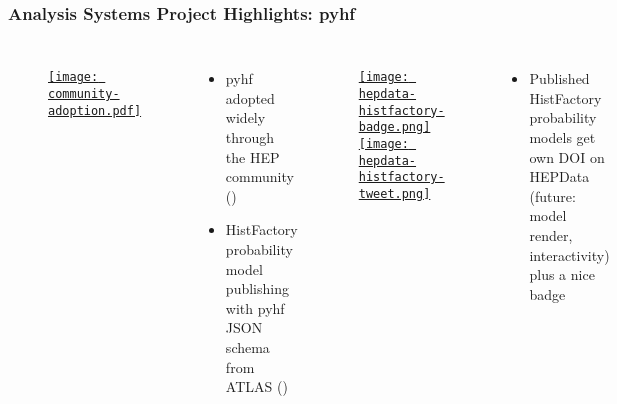 \begin{frame}
  \frametitle{Analysis Systems Project Highlights: pyhf}


  \begin{columns}
    \begin{figure}
        \begin{center}
            \href{https://scikit-hep.org/pyhf/citations.html}{\texttt{[image: community-adoption.pdf]}}
        \end{center}
    \end{figure}
    \begin{itemize}
      \item pyhf adopted widely through the HEP community ()
      \item HistFactory probability model publishing with pyhf JSON schema from ATLAS ()
    \end{itemize}
%
    \begin{figure}
        \begin{center}
            \href{https://www.hepdata.net/search/?q=analysis:HistFactory}{\texttt{[image: hepdata-histfactory-badge.png]}}
            \href{https://twitter.com/HEPData/status/1529038702344798212}{\texttt{[image: hepdata-histfactory-tweet.png]}}
        \end{center}
    \end{figure}
    \vspace{-10pt}
    \begin{itemize}
      \item Published HistFactory probability models get own DOI on HEPData (future: model render, interactivity) plus a nice badge
    \end{itemize}
  \end{columns}

\end{frame}

